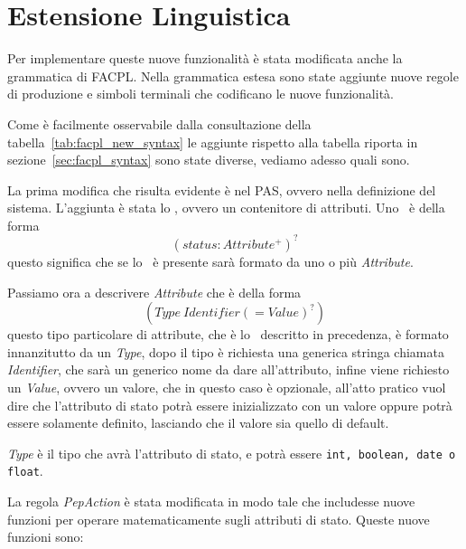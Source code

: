 \section{Estensione Linguistica} %
\label{sec:estensione_linguistica}
Per implementare queste nuove funzionalità è stata modificata anche la grammatica di FACPL.
Nella grammatica estesa sono state aggiunte nuove regole di produzione e simboli terminali che 
codificano le nuove funzionalità.\\ \par

Come è facilmente osservabile dalla consultazione della tabella~\ref{tab:facpl_new_syntax} le aggiunte rispetto alla tabella riporta in sezione~\ref{sec:facpl_syntax} sono state diverse, vediamo adesso quali sono.\\ \par
La prima modifica che risulta evidente è nel PAS, ovvero nella definizione del sistema. L'aggiunta è stata lo \status, ovvero un contenitore di attributi.
Uno \status \ è della forma $$(status: Attribute^+)^?$$ questo significa che se lo \status \ è presente sarà formato da uno o più \textit{Attribute}.\\ \par
Passiamo ora a descrivere \textit{Attribute} che è della forma $$(Type\ Identifier (= Value)^?)$$
questo tipo particolare di attribute, che è lo \statusattribute \ descritto in precedenza, è formato innanzitutto da un \textit{Type}, dopo il tipo è richiesta una generica stringa chiamata \textit{Identifier}, che sarà un generico nome da dare all'attributo, infine viene richiesto un \textit{Value}, ovvero un valore, che in questo caso è opzionale, all'atto pratico vuol dire che l'attributo di stato potrà essere inizializzato con un valore oppure potrà essere solamente definito, lasciando che il valore sia quello di default.\\ \par
\textit{Type} è il tipo che avrà l'attributo di stato, e potrà essere \texttt{int, boolean, date o float}.\\ \par
La regola \textit{PepAction} è stata modificata in modo tale che includesse nuove funzioni per operare matematicamente sugli attributi di stato.
Queste nuove funzioni sono:
